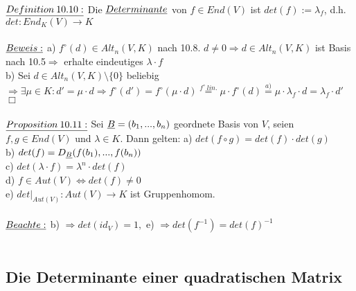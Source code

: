 \documentclass[fleqn, a4paper, 11pt]{scrartcl}
\theoremstyle{definition}
\begin{document}
\\
$\uline{Definition\:10.10:}$ Die $\uline{Determinante}$ von $f\in End(V)$ ist $det(f):=\lambda_f$, d.h. $det:End_K(V)\rightarrow K$\\
\\
$\uline{Beweis:}$ a) $f^{\circ}(d)\in Alt_n(V,K)$ nach 10.8. $d\neq 0\Rightarrow d\in Alt_n(V,K)$ ist Basis nach 10.5$\Rightarrow$ erhalte eindeutiges $\lambda\cdot f$\\
b) Sei $d\in Alt_n(V,K)\setminus\{0\}$ beliebig $\Rightarrow\exists\mu\in K:d'=\mu\cdot d\Rightarrow f^{\circ}(d')=f^{\circ}(\mu\cdot d)\stackrel{f^{\circ}\:lin.}{=}\mu\cdot f^{\circ}(d)\stackrel{a)}{=}\mu\cdot\lambda_f\cdot d=\lambda_f\cdot d'$ \hfill $\Box$\\
\\
$\uline{Proposition\:10.11:}$ Sei $\uline{B}=(b_1,...,b_n)$ geordnete Basis von $V$, seien $f,g\in End(V)$ und $\lambda\in K$. Dann gelten: a) $det(f\circ g)=det(f)\cdot det(g)$\\
b) $det(f)=D_{\uline{B}}(f(b_1),...,f(b_n))$\\
c) $det(\lambda\cdot f)=\lambda^n\cdot det(f)$\\
d) $f\in Aut(V)\Leftrightarrow det(f)\neq 0$\\
e) $det|_{Aut(V)}:Aut(V)\rightarrow K$ ist Gruppenhomom.\\
\\
$\uline{Beachte:}$ b) $\Rightarrow det(id_V)=1,$ e) $\Rightarrow det(f^{-1})=det(f)^{-1}$\\
\\
\subsection{Die Determinante einer quadratischen Matrix}
\end{document}

